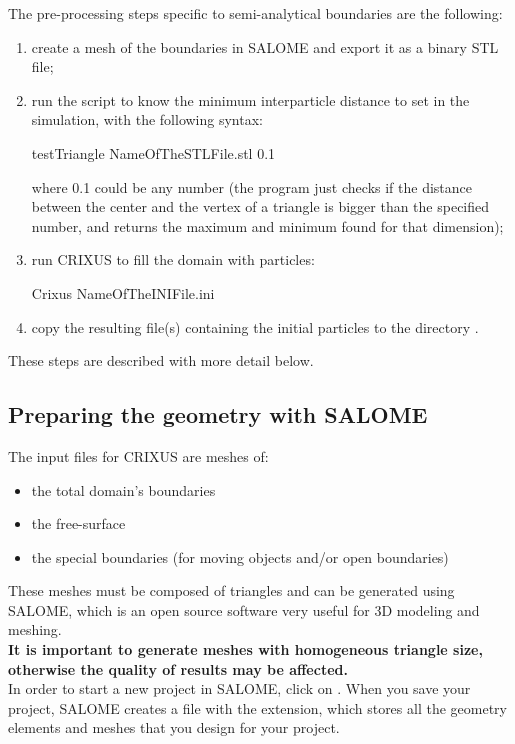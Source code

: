 \documentclass[12pt]{memoir}
\begin{document}
The pre-processing steps specific to semi-analytical boundaries 
are the following:
\begin{enumerate}
\item create a mesh of the boundaries in SALOME and 
export it as a binary STL file;
\item run the  script to know the 
minimum interparticle distance to set in the simulation, 
with the following syntax:
\begin{shellcode}
testTriangle NameOfTheSTLFile.stl 0.1
\end{shellcode}
where 0.1 could be any number (the program just checks if 
the distance between the center and the vertex of a 
triangle is bigger than the specified number, and returns 
the maximum and minimum found for that dimension);
\item run CRIXUS to fill the domain with particles:
\begin{shellcode}
Crixus NameOfTheINIFile.ini
\end{shellcode}
\item copy the resulting  file(s) containing 
the initial particles to the directory .
\end{enumerate}

These steps are described with more detail below.

\subsection{Preparing the geometry with SALOME}

The input files for CRIXUS are meshes of:
\begin{itemize}
\item the total domain's boundaries
\item the free-surface
\item the special boundaries (for moving objects 
and/or open boundaries)
\end{itemize}
These meshes must be composed of triangles and can 
be generated using SALOME, which is an open source 
software very useful for 3D modeling and meshing.\\

\textbf{It is important to generate meshes with homogeneous 
triangle size, otherwise the quality of results may be affected.}\\


In order to start a new project in SALOME, click on . 
When you save your project, SALOME creates a file with the 
 extension, which stores all the geometry elements 
and meshes that you design for your project.\\
\end{document}
